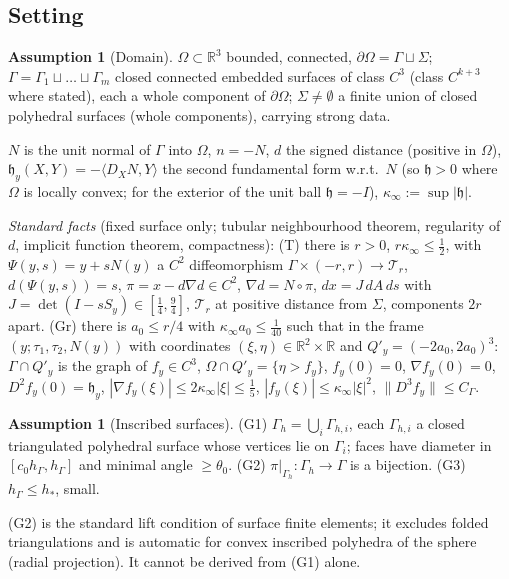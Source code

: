 \documentclass[11pt]{article}
\theoremstyle{definition}
\newtheorem{assumption}[theorem]{Assumption}
\newcommand{\R}{\mathbb R}
\newcommand{\hG}{h_\Gamma}
\newcommand{\Gh}{\Gamma_h}
\newcommand{\norm}[1]{\lVert #1\rVert}
\newcommand{\hh}{\mathfrak h}
\begin{document}
\subsection{Setting}
\begin{assumption}[Domain]\label{B:dom}
$\Omega\subset\R^3$ bounded, connected, $\partial\Omega=\Gamma\sqcup\Sigma$; $\Gamma=\Gamma_1\sqcup\dots\sqcup\Gamma_m$ closed connected embedded surfaces of class $C^3$ (class $C^{k+3}$ where stated), each a whole component of $\partial\Omega$; $\Sigma\ne\emptyset$ a finite union of closed polyhedral surfaces (whole components), carrying strong data.
\end{assumption}
$N$ is the unit normal of $\Gamma$ into $\Omega$, $n=-N$, $d$ the signed distance (positive in $\Omega$), $\hh_y(X,Y)=-\langle D_XN,Y\rangle$ the second fundamental form w.r.t.\ $N$ (so $\hh>0$ where $\Omega$ is locally convex; for the exterior of the unit ball $\hh=-I$), $\kappa_\infty:=\sup|\hh|$.

\emph{Standard facts} (fixed surface only; tubular neighbourhood theorem, regularity of $d$, implicit function theorem, compactness):
(T) there is $r>0$, $r\kappa_\infty\le\frac12$, with $\Psi(y,s)=y+sN(y)$ a $C^2$ diffeomorphism $\Gamma\times(-r,r)\to\mathcal T_r$, $d(\Psi(y,s))=s$, $\pi=x-d\nabla d\in C^2$, $\nabla d=N\circ\pi$, $dx=J\,dA\,ds$ with $J=\det(I-sS_y)\in[\frac14,\frac94]$, $\mathcal T_r$ at positive distance from $\Sigma$, components $2r$ apart.
(Gr) there is $a_0\le r/4$ with $\kappa_\infty a_0\le\frac1{40}$ such that in the frame $(y;\tau_1,\tau_2,N(y))$ with coordinates $(\xi,\eta)\in\R^2\times\R$ and $Q'_y=(-2a_0,2a_0)^3$: $\Gamma\cap Q'_y$ is the graph of $f_y\in C^3$, $\Omega\cap Q'_y=\{\eta>f_y\}$, $f_y(0)=0$, $\nabla f_y(0)=0$, $D^2f_y(0)=\hh_y$, $|\nabla f_y(\xi)|\le2\kappa_\infty|\xi|\le\frac15$, $|f_y(\xi)|\le\kappa_\infty|\xi|^2$, $\norm{D^3f_y}\le C_\Gamma$.

\begin{assumption}[Inscribed surfaces]\label{B:ins}
(G1) $\Gh=\bigcup_i\Gamma_{h,i}$, each $\Gamma_{h,i}$ a closed triangulated polyhedral surface whose vertices lie on $\Gamma_i$; faces have diameter in $[c_0\hG,\hG]$ and minimal angle $\ge\theta_0$. (G2) $\pi|_{\Gh}:\Gh\to\Gamma$ is a bijection. (G3) $\hG\le h_\ast$, small.
\end{assumption}
(G2) is the standard lift condition of surface finite elements; it excludes folded triangulations and is automatic for convex inscribed polyhedra of the sphere (radial projection). It cannot be derived from (G1) alone.
\end{document}
